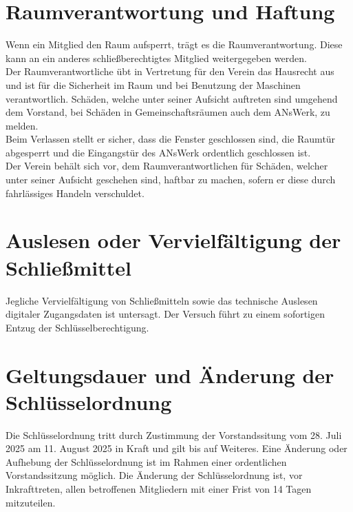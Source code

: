 \section{Raumverantwortung und Haftung}
Wenn ein Mitglied den Raum aufsperrt, trägt es die Raumverantwortung. Diese kann an ein anderes schließberechtigtes Mitglied weitergegeben werden.\\
Der Raumverantwortliche übt in Vertretung für den Verein das Hausrecht aus und ist für die Sicherheit im Raum und bei Benutzung der Maschinen verantwortlich. Schäden, welche unter seiner Aufsicht auftreten sind umgehend dem Vorstand, bei Schäden in Gemeinschaftsräumen auch dem ANsWerk, zu melden.\\
Beim Verlassen stellt er sicher, dass die Fenster geschlossen sind, die Raumtür abgesperrt und die Eingangstür des ANsWerk ordentlich geschlossen ist.\\
Der Verein behält sich vor, dem Raumverantwortlichen für Schäden, welcher unter seiner Aufsicht geschehen sind, haftbar zu machen, sofern er diese durch fahrlässiges Handeln verschuldet.\\

\section{Auslesen oder Vervielfältigung der Schließmittel}
Jegliche Vervielfältigung von Schließmitteln sowie das technische Auslesen digitaler Zugangsdaten ist untersagt.
Der Versuch führt zu einem sofortigen Entzug der Schlüsselberechtigung.

\section{Geltungsdauer und Änderung der Schlüsselordnung}
Die Schlüsselordnung tritt durch Zustimmung der Vorstandssitung vom 28. Juli 2025 am 11. August 2025 in Kraft und gilt bis auf Weiteres. Eine Änderung oder Aufhebung der Schlüsselordnung ist im Rahmen einer ordentlichen Vorstandssitzung möglich. Die Änderung der Schlüsselordnung ist, vor Inkrafttreten, allen betroffenen Mitgliedern mit einer Frist von 14 Tagen mitzuteilen.

